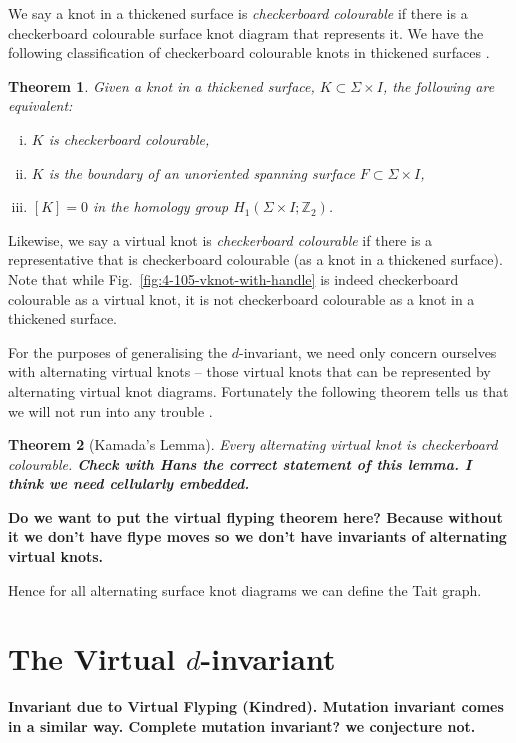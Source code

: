 \documentclass[12pt]{report}
\newcommand{\Z}{\mathbb{Z}}
\newcommand{\notered}[1]{{\color{Red} \textbf{#1}}}
\newcommand{\notegreen}[1]{{\color{Green} \textbf{#1}}}
\newtheorem*{theorem}{Theorem}
\begin{document}
We say a knot in a thickened surface is \textit{checkerboard colourable} if there is a checkerboard colourable surface knot diagram that represents it. We have the following classification of checkerboard colourable knots in thickened surfaces \cite{minimal-diagrams-surface-links}.

\begin{theorem}
Given a knot in a thickened surface, $K \subset \Sigma \times I$, the following are equivalent:
	\begin{enumerate}[(i)]
	\item $K$ is checkerboard colourable,
	\item $K$ is the boundary of an unoriented spanning surface $F \subset \Sigma \times I$,
	\item $[K] = 0$ in the homology group $H_{1}(\Sigma \times I; \Z_{2})$.
	\end{enumerate} 
\end{theorem}

Likewise, we say a virtual knot is \textit{checkerboard colourable} if there is a representative that is checkerboard colourable (as a knot in a thickened surface). Note that while Fig.~\ref{fig:4-105-vknot-with-handle} is indeed checkerboard colourable as a virtual knot, it is not checkerboard colourable as a knot in a thickened surface.

For the purposes of generalising the $d$-invariant, we need only concern ourselves with alternating virtual knots -- those virtual knots that can be represented by alternating virtual knot diagrams. Fortunately the following theorem tells us that we will not run into any trouble \cite{jones-polynomial-checkerboard-colourable}.

\begin{theorem}[Kamada's Lemma]
	Every alternating virtual knot is checkerboard colourable. \notered{Check with Hans the correct statement of this lemma. I think we need cellularly embedded.}
\end{theorem}

\notered{Do we want to put the virtual flyping theorem here? Because without it we don't have flype moves so we don't have invariants of alternating virtual knots.}

Hence for all alternating surface knot diagrams we can define the Tait graph. 

\section{The Virtual $d$-invariant}
\notegreen{Invariant due to Virtual Flyping (Kindred). Mutation invariant comes in a similar way. Complete mutation invariant? we conjecture not.}
\end{document}
